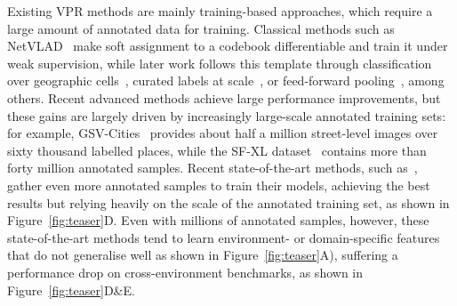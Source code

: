 Existing VPR methods are mainly training-based approaches, which require a large amount of annotated data for training. Classical methods such as NetVLAD~\citep{netvlad} make soft assignment to a codebook differentiable and train it under weak supervision, while later work follows this template through classification over geographic cells~\citep{cosplace,eigenplaces}, curated labels at scale~\citep{gsvcities}, or feed-forward pooling~\citep{mixvpr}, among others. Recent advanced methods achieve large performance improvements, but these gains are largely driven by increasingly large-scale annotated training sets: for example, GSV-Cities~\citep{gsvcities} provides about half a million street-level images over sixty thousand labelled places, while the SF-XL dataset~\citep{cosplace,eigenplaces} contains more than forty million annotated samples. Recent state-of-the-art methods, such as~\citep{megaloc}, gather even more annotated samples to train their models, achieving the best results but relying heavily on the scale of the annotated training set, as shown in Figure~\ref{fig:teaser}D. Even with millions of annotated samples, however, these state-of-the-art methods tend to learn environment- or domain-specific features that do not generalise well as shown in Figure~\ref{fig:teaser}A), suffering a performance drop on cross-environment benchmarks, as shown in Figure~\ref{fig:teaser}D\&E. 


